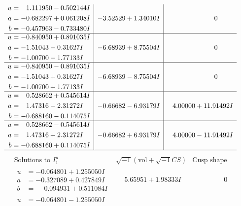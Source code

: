 \documentclass[1p]{elsarticle_modified}
\theoremstyle{definition}
\newcommand{\I}{\sqrt{-1}}
\begin{document}
$$\begin{array}{c|c|c}
\begin{aligned}
u &= \phantom{-}1.111950 - 0.502144 I \\
a &= -0.682297 + 0.061208 I \\
b &= -0.457963 - 0.733480 I\end{aligned}
 & -3.52529 + 1.34010 I & \phantom{-0.000000 } 0 \\ \hline\begin{aligned}
u &= -0.840950 + 0.891035 I \\
a &= -1.51043 - 0.31627 I \\
b &= -1.00700 - 1.77133 I\end{aligned}
 & -6.68939 + 8.75504 I & \phantom{-0.000000 } 0 \\ \hline\begin{aligned}
u &= -0.840950 - 0.891035 I \\
a &= -1.51043 + 0.31627 I \\
b &= -1.00700 + 1.77133 I\end{aligned}
 & -6.68939 - 8.75504 I & \phantom{-0.000000 } 0 \\ \hline\begin{aligned}
u &= \phantom{-}0.528662 + 0.545614 I \\
a &= \phantom{-}1.47316 - 2.31272 I \\
b &= -0.688160 - 0.114075 I\end{aligned}
 & -0.66682 - 6.93179 I & \phantom{-}4.00000 + 11.91492 I \\ \hline\begin{aligned}
u &= \phantom{-}0.528662 - 0.545614 I \\
a &= \phantom{-}1.47316 + 2.31272 I \\
b &= -0.688160 + 0.114075 I\end{aligned}
 & -0.66682 + 6.93179 I & \phantom{-}4.00000 - 11.91492 I\\
 \hline 
 \end{array}$$\newpage$$\begin{array}{c|c|c}  
\text{Solutions to }I^u_{1}& \I (\text{vol} + \sqrt{-1}CS) & \text{Cusp shape}\\
 \hline 
\begin{aligned}
u &= -0.064801 + 1.255050 I \\
a &= -0.327089 + 0.427849 I \\
b &= \phantom{-}0.094931 + 0.511084 I\end{aligned}
 & \phantom{-}5.65951 + 1.98333 I & \phantom{-0.000000 } 0 \\ \hline\begin{aligned}
u &= -0.064801 - 1.255050 I \\

\end{aligned}
\end{array}$$
\end{document}
